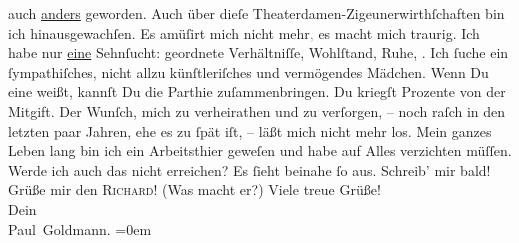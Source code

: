 \begin{ledgroupsized}[t]{13cm}
               auch \uline{anders} geworden.\pend
           \pstart
           Auch über dieſe Theaterdamen-Zigeunerwirthſchaften bin ich hinausgewachſen. Es
               amüſirt mich nicht mehr\textcolor{gray}{,} es macht mich \strikeout{\textcolor{gray}{trau}} traurig. {\pb}Ich habe nur \uline{eine} Sehnſucht: geordnete Verhältniſſe, Wohlſtand, Ruhe, \label{K_L02903-3v}\label{K_L02903-3h}. Ich ſuche ein
               ſympathiſches, nicht allzu künſtleriſches und vermögendes Mädchen. Wenn Du eine
               weißt, kannſt Du die Parthie zuſammenbringen. Du kriegſt Prozente von der
               Mitgift.\pend
           \pstart
           Der Wunſch, mich zu verheirathen und zu verſorgen, – noch raſch in den letzten paar
               Jahren, ehe es zu ſpät iſt, – läßt mich nicht mehr los. Mein ganzes Leben lang bin
               ich ein Arbeitsthier geweſen und habe auf Alles verzichten müſſen. Werde ich auch das
               nicht erreichen? Es ſieht {\pb}beinahe ſo aus.\pend
           \pstart
           Schreib’ mir bald!\pend
           \pstart
           Grüße mir den \textsc{Richard}! (Was macht er?)\pend
           \pstart
           Viele treue Grüße! {\\[\baselineskip]}Dein {\\[\baselineskip]}\spacefill\mbox{Paul Goldmann.}\pend
           \leftskip=0em{}
         
         \endnumbering{}\end{ledgroupsized}  \newcommand{\dateiname}{L02903}\newcommand{\titel}{Paul Goldmann an Arthur Schnitzler, 23. 1. [1900]}\newcommand{\editorInnen}{Martin Anton Müller und Laura Untner}
      
